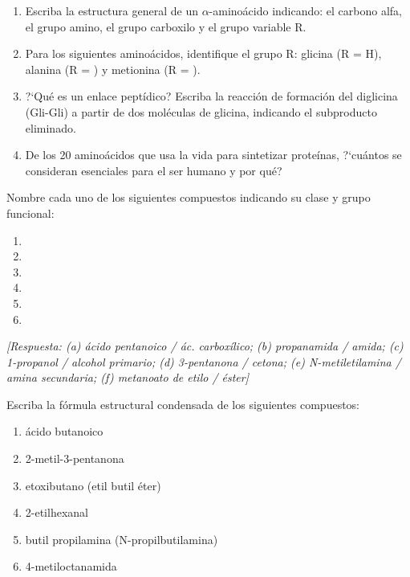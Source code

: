 \begin{bloque_ejercicios}
\begin{ejercicios}
\begin{enumerate}[label=\alph*)]
    \item Escriba la estructura general de un $\alpha$-amino\'acido
          indicando: el carbono alfa, el grupo amino, el grupo
          carboxilo y el grupo variable R.
    \item Para los siguientes amino\'acidos, identifique el grupo R:
          glicina (R = H), alanina (R = ) y
          metionina (R = ).
    \item ?`Qu\'e es un enlace pept\'idico? Escriba la reacci\'on
          de formaci\'on del diglicina (Gli-Gli) a partir de dos
          mol\'eculas de glicina, indicando el subproducto
          eliminado.
    \item De los 20 amino\'acidos que usa la vida para sintetizar
          prote\'inas, ?`cu\'antos se consideran esenciales para
          el ser humano y por qu\'e?
\end{enumerate}

\item Nombre cada uno de los siguientes compuestos indicando
su clase y grupo funcional:

\begin{enumerate}[label=\alph*)]
    \item {}
    \item {}
    \item {}
    \item {}
    \item {}
    \item {}
\end{enumerate}

\textit{[Respuesta:
(a) \'acido pentanoico / \'ac. carbox\'ilico;
(b) propanamida / amida;
(c) 1-propanol / alcohol primario;
(d) 3-pentanona / cetona;
(e) N-metiletilamina / amina secundaria;
(f) metanoato de etilo / \'ester]}

\item Escriba la f\'ormula estructural condensada de los
siguientes compuestos:

\begin{enumerate}[label=\alph*)]
    \item \'acido butanoico
    \item 2-metil-3-pentanona
    \item etoxibutano (etil butil \'eter)
    \item 2-etilhexanal
    \item butil propilamina (N-propilbutilamina)
    \item 4-metiloctanamida
\end{enumerate}


\end{ejercicios}
\end{bloque_ejercicios}
